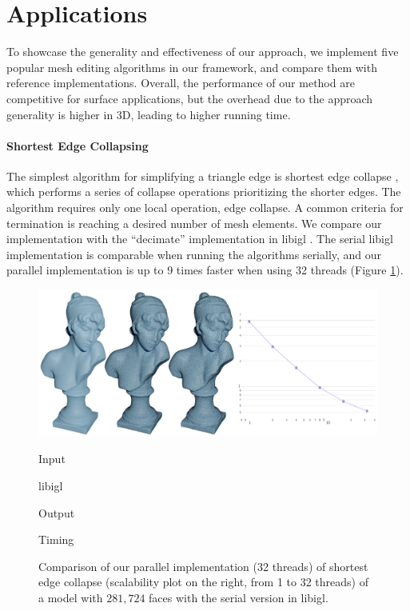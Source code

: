 \section{Applications}
\label{wmtk:sec:applications}

To showcase the generality and effectiveness of our approach, we implement five popular mesh editing algorithms in our framework, and compare them with reference implementations. Overall, the performance of our method are competitive for surface applications, but the overhead due to the approach generality is higher in 3D, leading to higher running time.

\paragraph{Shortest Edge Collapsing}

The simplest algorithm for simplifying a triangle edge is shortest edge collapse \cite{hoppe1996progressive}, which performs a series of collapse operations prioritizing the shorter edges. The algorithm requires only one local operation, edge collapse. A common criteria for termination is reaching a desired number of mesh elements. We compare our implementation with the ``decimate'' implementation in libigl \cite{jacobson2016libigl}. The serial libigl implementation is comparable when running the algorithms serially, and our parallel implementation is up to 9 times faster when using 32 threads (Figure \ref{fig:decimate}).

\begin{figure}
    \centering\footnotesize
    \includegraphics[width=\linewidth]{wmtk-tex/figs/2d-sec-statue.pdf}
    \parbox{.15\linewidth}{\centering Input}\hfill
    \parbox{.15\linewidth}{\centering libigl}
    \hfill
    \parbox{.15\linewidth}{\centering Output}\hfill
    \parbox{.3\linewidth}{\centering Timing}\par
    \caption{
    Comparison of our parallel implementation (32 threads) of shortest edge collapse (scalability plot on the right, from 1 to 32 threads) of a model with $281,724$ faces with the serial version in libigl. }
    
    \label{fig:decimate}
\end{figure}


